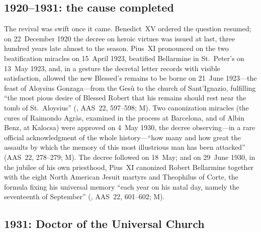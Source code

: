 
\subsection{1920--1931: the cause completed}

The revival was swift once it came. Benedict~XV ordered the
question resumed; on 22~December 1920 the decree on heroic
virtues was issued at last, three hundred years late almost to
the season. Pius~XI pronounced on the two beatification miracles
on 15~April 1923, beatified Bellarmine in St.~Peter's on 13~May
1923, and, in a gesture the decretal letter records with visible
satisfaction, allowed the new Blessed's remains to be borne on
21~June 1923---the feast of Aloysius Gonzaga---from the Ges\`u to
the church of Sant'Ignazio, fulfilling ``the most pious desire of
Blessed Robert that his remains should rest near the tomb of
St.~Aloysius'' (, AAS~22, 597--598; M). Two
canonization miracles (the cures of Raimondo Agr\`as, examined in
the process at Barcelona, and of Albin Benz, at Kalocsa) were
approved
on 4~May 1930, the decree observing---in a rare official
acknowledgment of the whole history---``how many and how great
the assaults by which the memory of this most illustrious man has
been attacked'' (AAS~22, 278--279; M). The  decree
followed on 18~May; and on 29~June 1930, in the jubilee of his
own priesthood, Pius~XI canonized Robert Bellarmine together with
the eight North American Jesuit martyrs and Theophilus of Corte,
the formula fixing his universal memory ``each year on his natal
day, namely the seventeenth of September'' (,
AAS~22, 601--602; M).

\subsection{1931: Doctor of the Universal Church}

